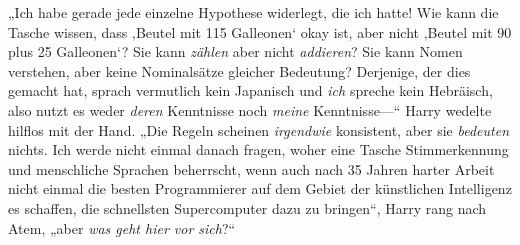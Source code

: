 „Ich habe gerade jede einzelne Hypothese widerlegt, die ich hatte! Wie kann die Tasche wissen, dass ‚Beutel mit 115 Galleonen‘ okay ist, aber nicht ‚Beutel mit 90 plus 25 Galleonen‘? Sie kann \emph{zählen} aber nicht \emph{addieren}? Sie kann Nomen verstehen, aber keine Nominalsätze gleicher Bedeutung? Derjenige, der dies gemacht hat, sprach vermutlich kein Japanisch und \emph{ich} spreche kein Hebräisch, also nutzt es weder \emph{deren} Kenntnisse noch \emph{meine} Kenntnisse—“ Harry wedelte hilflos mit der Hand. „Die Regeln scheinen \emph{irgendwie} konsistent, aber sie \emph{bedeuten} nichts. Ich werde nicht einmal danach fragen, woher eine Tasche Stimmerkennung und menschliche Sprachen beherrscht, wenn auch nach 35 Jahren harter Arbeit nicht einmal die besten Programmierer auf dem Gebiet der künstlichen Intelligenz es schaffen, die schnellsten Supercomputer dazu zu bringen“, Harry rang nach Atem, „aber \emph{was geht hier vor sich}?“

